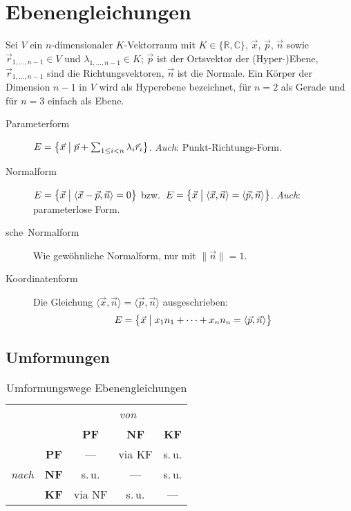\section{Ebenengleichungen}

Sei $V$ ein $n$-dimensionaler $K$-Vektorraum mit $K \in \{\mathbb R, \mathbb C\}$, $\vec x$, $\vec p$, $\vec n$ sowie $\vec r_{1,\ldots,n-1} \in V$ und $\lambda_{1,\ldots,n-1} \in K$; $\vec p$ ist der Ortsvektor der (Hyper-)Ebene, $\vec r_{1,\ldots,n-1}$ sind die Richtungsvektoren, $\vec n$ ist die Normale.
Ein Körper der Dimension $n-1$ in $V$ wird als Hyperebene bezeichnet, für $n=2$ als Gerade und für $n=3$ einfach als Ebene.

\begin{description}
  \item [Parameterform] 
	$E = \bigl\{ \vec x \bigm| \vec p + \sum_{1 \leq i < n} \lambda_i\vec r_i \bigr\}$.
	\emph{Auch}: Punkt-Richtungs-Form.
  \item [Normalform] 
	$E = \bigl\{ \vec x \bigm| \langle \vec x-\vec p, \vec n \rangle = 0 \bigr\}$
	bzw.~$E = \bigl\{ \vec x \bigm| \langle \vec x, \vec n \rangle = \langle \vec p, \vec n \rangle \bigr\} $.
	\emph{Auch}: parameterlose Form.
  \item [sche~Normalform] 
	Wie gewöhnliche Normalform, nur mit $\lVert\vec n\rVert=1$.
  \item [Koordinatenform] 
	Die Gleichung $\langle \vec{x},\vec{n}\rangle =\langle \vec{p},\vec{n}\rangle$ ausgeschrieben:
	\[ E = \bigl\{ \vec x \bigm| x_1 n_1 + \cdots + x_n n_n = \langle \vec{p},\vec{n}\rangle \bigr\} \]
\end{description}


\subsection{Umformungen}


\begin{table}[h]
\centering
\begin{tabular}{lcccc}
  && \multicolumn{3}{c}{\emph{von}} \\
  && \bfseries PF & \bfseries NF & \bfseries KF \\
  \multirow{3}{*}{\begin{sideways} \emph{nach} \end{sideways}}
    & \bfseries PF & --- & via KF & s.\,u. \\
    & \bfseries NF & s.\,u. & --- & s.\,u. \\
    & \bfseries KF & via NF & s.\,u. & --- \\
\end{tabular}
\caption{Umformungswege Ebenengleichungen}
\end{table}



